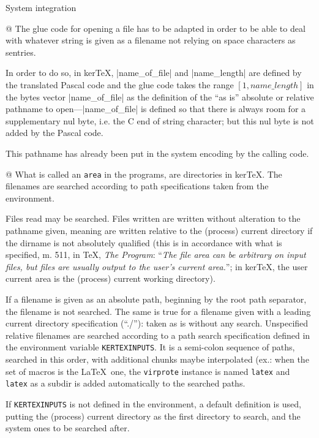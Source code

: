 \enddiv %

\enddiv %

\begindiv System integration

@ The glue code for opening a file has to be adapted in order to be able
to deal with whatever string is given as a filename not relying on
space characters as sentries.

In order to do so, in ker\TeX, |name_of_file| and |name_length|
are defined by the translated Pascal code and the glue code takes the
range $[1, name\_length]$ in the bytes vector |name_of_file|
as the definition of the ``as is'' absolute or relative pathname
to open---|name_of_file| is defined so that there is always room for
a supplementary nul byte, i.e. the C end of string character; but
this nul byte is not added by the Pascal code.

This pathname has already been put in the system encoding by the
calling code.

@ What is called an {\tt area} in the programs, are directories in
ker\TeX. The filenames are searched according to path specifications
taken from the environment.

Files read may be searched. Files written are written without alteration
to the pathname given, meaning are written relative to the (process)
current directory if the dirname is not absolutely qualified
(this is in accordance with what is specified, m. 511, in
\TeX, {\sl The Program}: ``{\sl The file area can be arbitrary on input
files, but files are usually output to the user's current area.}''; in
ker\TeX, the user current area is the (process) current working directory).

If a filename is given as an absolute path, beginning by the root path
separator, the filename is not searched. The same is true for a filename
given with a leading current directory specification (``./''): taken
as is without any search. Unspecified relative filenames are searched
according to a path search specification defined in the environment
variable {\tt KERTEXINPUTS}. It is a semi-colon sequence of paths,
searched in this order, with additional chunks maybe interpolated (ex.:
when the set of macros is the La\TeX\ one, the {\tt virprote} instance
is named {\tt latex} and {\tt latex} as a subdir is added automatically
to the searched paths.

If {\tt KERTEXINPUTS} is not defined in the environment, a default
definition is used, putting the (process) current directory as the first
directory to search, and the system ones to be searched after.

